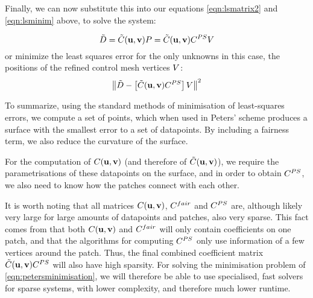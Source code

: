 Finally, we can now substitute this into our equations \ref{eqn:lsmatrix2} and \ref{eqn:lsminim} above, to solve the system:

\begin{equation}
\lsDataPointConcMatrix = \lsControlCoefConcMatrix(\vec{u},\vec{v})\lsControlPointMatrix = \lsControlCoefConcMatrix(\vec{u},\vec{v})\petersControlPointCoefMatrix\petersPatchPointMatrix
\end{equation}
or minimize the least squares error for the only unknowns in this case, the positions of the refined control mesh vertices $\petersPatchPointMatrix$:
\begin{equation}
\norm{\lsDataPointConcMatrix - \left [\lsControlCoefConcMatrix(\vec{u},\vec{v})\petersControlPointCoefMatrix\right ]\petersPatchPointMatrix}^2
\label{eqn:petersminimisation}
\end{equation}

To summarize, using the standard methods of minimisation of least-squares errors, we compute a set of points, which when used in Peters' scheme produces a surface with the smallest error to a set of datapoints. By including a fairness term, we also reduce the curvature of the surface.

For the computation of  $\lsControlPointCoefMatrix(\vec{u},\vec{v})$ (and therefore of $\lsControlCoefConcMatrix(\vec{u},\vec{v})$), we require the parametrisations of these datapoints on the surface, and in order to obtain $\petersControlPointCoefMatrix$, we also need to know how the patches connect with each other. 

It is worth noting that all matrices $\lsControlPointCoefMatrix(\vec{u},\vec{v})$, $\lsControlPointCoefMatrix^{fair}$ and $\petersControlPointCoefMatrix$ are, although likely very large for large amounts of datapoints and patches, also very sparse. This fact comes from that both $\lsControlPointCoefMatrix(\vec{u},\vec{v})$ and $\lsControlPointCoefMatrix^{fair}$ will only contain coefficients on one patch, and that the algorithms for computing $\petersControlPointCoefMatrix$ only use information of a few vertices around the patch. Thus, the final combined coefficient matrix $\lsControlCoefConcMatrix(\vec{u},\vec{v})\petersControlPointCoefMatrix$ will also have high sparsity. For solving the minimisation problem of \autoref{eqn:petersminimisation}, we will therefore be able to use specialised, fast solvers for sparse systems, with lower complexity, and therefore much lower runtime.
